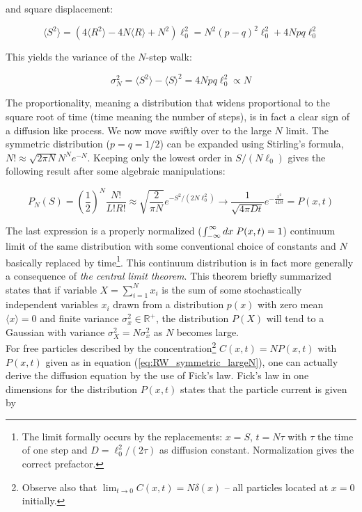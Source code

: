 \documentclass[a4paper, 11pt, notitlepage,english]{article}
\begin{document}
and square displacement:

\begin{equation}
\langle S^2 \rangle = (4\langle R^2 \rangle -4N\langle R \rangle +  N^2)\ell_0^2 = N^2(p-q)^2\ell_0^2 + 4Npq\ell_0^2
\label{eq:RW_displacement_sq}
\end{equation}

This yields the variance of the $N$-step walk:

\begin{equation}
\sigma_N^2 = \langle S^2 \rangle - \langle S \rangle^2 = 4Npq\ell_0^2 \propto N
\label{eq:RW_variance}
\end{equation}

The proportionality, meaning a distribution that widens proportional to the square root of time (time meaning the number of steps), is in fact a clear sign of a diffusion like process. We now move swiftly over to the large $N$ limit. The symmetric distribution ($p=q=1/2$) can be expanded using Stirling's formula, $N! \approx \sqrt{2\pi N} N^N e^{-N}$. Keeping only the lowest order in $S/(N\ell_0)$ gives the following result after some algebraic manipulations:

\begin{equation}
P_N(S) = \left( \frac{1}{2} \right)^N \frac{N!}{L!R!} \approx \sqrt{\frac{2}{\pi N}} e^{-S^2/(2N\ell_0^2)} \to \frac{1}{\sqrt{4\pi D t}} e^{-\frac{x^2}{4Dt}} = P(x,t)
\label{eq:RW_symmetric_largeN}
\end{equation}

The last expression is a properly normalized ($\int_{-\infty}^{\infty} dx \hspace{1mm} P(x,t) =1 $) continuum limit of the same distribution with some conventional choice of constants and $N$ basically replaced by time\footnote{The limit formally occurs by the replacements: $x = S$, $t = N\tau$ with $\tau$ the time of one step and $D = \ell_0^2/(2\tau)$ as diffusion constant. Normalization gives the correct prefactor.}. This continuum distribution is in fact more generally a consequence of \emph{the central limit theorem}. This theorem briefly summarized states that if variable $X = \sum_{i=1}^N x_i$ is the sum of some stochastically independent variables $x_i$ drawn from a distribution $p(x)$ with zero mean $\langle x \rangle = 0$ and finite variance $\sigma_x^2 \in \mathbb{R}^+$, the distribution $P(X)$ will tend to a Gaussian with variance $\sigma_X^2 = N\sigma_x^2$ as $N$ becomes large. \\

For free particles described by the concentration\footnote{Observe also that $\lim_{t\to 0}C(x,t) = N\delta(x)$ – all particles located at $x=0$ initially.} $C(x,t) = NP(x,t)$ with $P(x,t)$ given as in equation (\ref{eq:RW_symmetric_largeN}), one can actually derive the diffusion equation by the use of Fick's law. Fick's law in one dimensions for the distribution $P(x,t)$ states that the particle current is given by 
\end{document}
